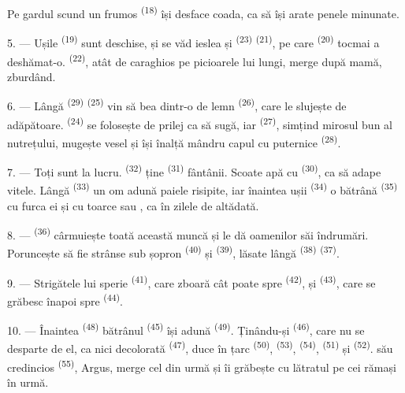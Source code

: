 Pe gardul scund un  frumos \textsuperscript{(18)} își desface coada,
ca să își arate penele minunate.

\VUsaut{3.0mm}

5. --- Ușile  \textsuperscript{(19)} sunt deschise, și se văd
ieslea și  \textsuperscript{(23)} 
\textsuperscript{(21)}, pe care 
\textsuperscript{(20)} tocmai a deshămat-o.  \textsuperscript{(22)},
atât de caraghios pe picioarele lui lungi, merge după mamă, zburdând.

6. --- Lângă  \textsuperscript{(29)} 
\textsuperscript{(25)} vin să bea dintr-o  de lemn
\textsuperscript{(26)}, care le slujește de adăpătoare. 
\textsuperscript{(24)} se folosește de prilej ca să sugă, iar 
\textsuperscript{(27)}, simțind mirosul bun al nutrețului, mugește vesel și își
înalță mândru capul cu  puternice \textsuperscript{(28)}.

7. --- Toți sunt la lucru.  \textsuperscript{(32)} ține
 \textsuperscript{(31)} fântânii. Scoate apă cu 
\textsuperscript{(30)}, ca să adape vitele. Lângă 
\textsuperscript{(33)} un om adună paiele risipite, iar înaintea ușii
 \textsuperscript{(34)} o  bătrână
\textsuperscript{(35)} cu furca ei și cu  toarce  sau
, ca în zilele de altădată.

\VUsaut{3.0mm}
\VUsaut{3.0mm}

8. ---  \textsuperscript{(36)} cârmuiește toată această muncă și
le dă oamenilor săi îndrumări. Poruncește să fie strânse sub șopron
 \textsuperscript{(40)} și 
\textsuperscript{(39)}, lăsate lângă  \textsuperscript{(38)}
 \textsuperscript{(37)}.

9. --- Strigătele lui sperie  \textsuperscript{(41)}, care
zboară cât poate spre  \textsuperscript{(42)}, și
 \textsuperscript{(43)}, care se grăbesc înapoi spre
 \textsuperscript{(44)}.

10. --- Înaintea  \textsuperscript{(48)} bătrânul
 \textsuperscript{(45)} își adună 
\textsuperscript{(49)}. Ținându-și  \textsuperscript{(46)}, care nu se
desparte de el, ca nici  decolorată \textsuperscript{(47)}, duce în
țarc  \textsuperscript{(50)}, 
\textsuperscript{(53)},  \textsuperscript{(54)},
 \textsuperscript{(51)} și  \textsuperscript{(52)}.
 său credincios \textsuperscript{(55)}, Argus, merge cel din urmă
și îi grăbește cu lătratul pe cei rămași în urmă.

